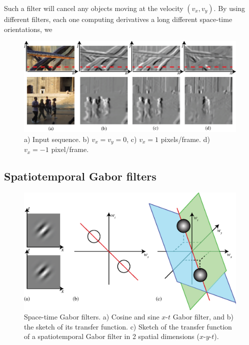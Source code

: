 Such a filter will cancel any objects moving at the velocity $(v_x,v_y)$. By using different filters, each one computing derivatives a long different space-time orientations, we



\begin{figure}
    \includegraphics[width=1\linewidth]{figures/temporal_filters/seq_filtered_der.eps}
    \caption{a) Input sequence. b) $v_x=v_y=0$, c) $v_x=1$ pixels/frame. d) $v_x=-1$ pixel/frame.}
    \label{fig:tunedfilter}
\end{figure}


%
%





\subsection{Spatiotemporal Gabor filters}

\begin{figure}
    \centerline{
        \includegraphics[width=1\linewidth]{figures/temporal_filters/gabor_spacetime_FT.eps}
    }
    \caption{Space-time Gabor filters. a) Cosine and sine $x$-$t$ Gabor filter, and b) the sketch of its transfer function. c) Sketch of the transfer function of a spatiotemporal Gabor filter in 2 spatial dimensions ($x$-$y$-$t$).}
    \label{fig:spacetimefilts}
\end{figure}


